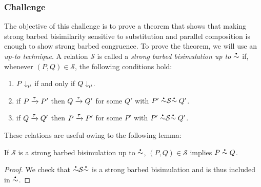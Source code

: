 \subsubsection{Challenge}
The objective of this challenge is to prove a theorem that shows that
making strong barbed bisimilarity sensitive to substitution and
parallel composition is enough to show strong barbed
congruence.
To prove the theorem, we will use an \emph{up-to technique}.
A relation \( \mathcal{S} \) is called a \emph{strong barbed bisimulation up to \( \sbbisim{}{} \)} if, whenever \( (P,Q) \in \mathcal{S} \), the following conditions hold:
\begin{enumerate}
\item \( P\downarrow_{\mu} \) if and only if \( Q\downarrow_{\mu} \).
\item if \( P \xrightarrow{\tau} P' \) then \( Q \xrightarrow{\tau} Q' \) for some \( Q' \) with \( \uptosbb{P'}{\mathcal{S}}{Q'} \).
\item if \( Q \xrightarrow{\tau} Q' \) then \( P \xrightarrow{\tau} P' \) for some \( P' \) with \( \uptosbb{P'}{\mathcal{S}}{Q'} \).
\end{enumerate}
These relations are useful owing to the following lemma:
\begin{lemma}\label{lemma:up-to}
  If \( \mathcal{S} \) is a strong barbed bisimulation up to \( \sbbisim{}{} \), \( (P,Q) \in \mathcal{S} \) implies \( \sbbisim{P}{Q} \).
\end{lemma}
\begin{proof}
  We check that \( \uptosbb{}{\mathcal{S}}{} \) is a strong barbed bisimulation and is thus included in \( \sbbisim{}{} \).
\end{proof}

